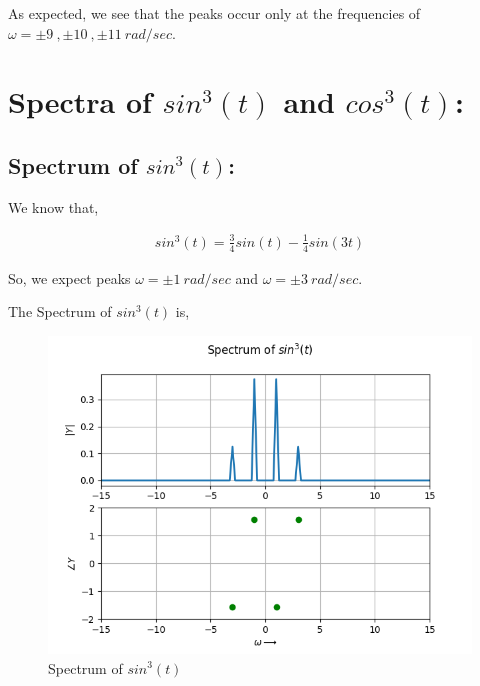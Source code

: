 \documentclass[11pt, a4paper]{article}
\begin{document}
As expected, we see that the peaks occur only at the frequencies of $\omega = \pm 9\ , \pm 10\ , \pm 11\ rad/sec$.
\clearpage

\section{Spectra of $sin^3(t)$ and $cos^3(t)$:}
\subsection{Spectrum of $sin^3(t)$:}
We know that,

\begin{gather}
    sin^3(t) = \frac{3}{4}sin(t) - \frac{1}{4}sin(3t)
\end{gather}

So, we expect peaks $\omega = \pm 1\ rad/sec$ and $\omega = \pm 3\ rad/sec$.

The Spectrum of $sin^3(t)$ is,
\begin{figure}[H]
    \centering
    \includegraphics[scale=0.65]{Figure_3.png}
    \caption{Spectrum of $sin^3(t)$}
    \label{fig:sin^3t}
\end{figure}
\end{document}
